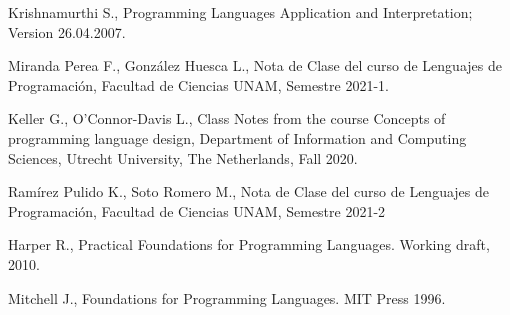 \documentclass[12pt]{extarticle}
\begin{document}
\begin{thebibliography}{9}


Krishnamurthi S., Programming Languages Application and Interpretation; Version 26.04.2007.

Miranda Perea F., González Huesca L., Nota de Clase del curso de Lenguajes de Programación, Facultad de Ciencias UNAM, Semestre 2021-1.

Keller G., O'Connor-Davis L., Class Notes from the course Concepts of programming language design, Department of Information and Computing Sciences, Utrecht University, The Netherlands, Fall 2020.

Ramírez Pulido K., Soto Romero M., Nota de Clase del curso de Lenguajes de Programación, Facultad de Ciencias UNAM, Semestre 2021-2

Harper R., Practical Foundations for Programming Languages. Working draft, 2010.

Mitchell J., Foundations for Programming Languages. MIT Press 1996.



\end{thebibliography}
\end{document}
